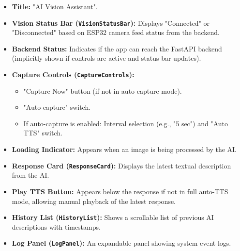 \documentclass[12pt, a4paper]{report}
\begin{document}
\begin{itemize}
    \item \textbf{Title:} "AI Vision Assistant".
    \item \textbf{Vision Status Bar (\texttt{VisionStatusBar}):} Displays "Connected" or "Disconnected" based on ESP32 camera feed status from the backend.
    \item \textbf{Backend Status:} Indicates if the app can reach the FastAPI backend (implicitly shown if controls are active and status bar updates).
    \item \textbf{Capture Controls (\texttt{CaptureControls}):}
        \begin{itemize}
            \item "Capture Now" button (if not in auto-capture mode).
            \item "Auto-capture" switch.
            \item If auto-capture is enabled: Interval selection (e.g., "5 sec") and "Auto TTS" switch.
        \end{itemize}
    \item \textbf{Loading Indicator:} Appears when an image is being processed by the AI.
    \item \textbf{Response Card (\texttt{ResponseCard}):} Displays the latest textual description from the AI.
    \item \textbf{Play TTS Button:} Appears below the response if not in full auto-TTS mode, allowing manual playback of the latest response.
    \item \textbf{History List (\texttt{HistoryList}):} Shows a scrollable list of previous AI descriptions with timestamps.
    \item \textbf{Log Panel (\texttt{LogPanel}):} An expandable panel showing system event logs.
\end{itemize}
\end{document}
